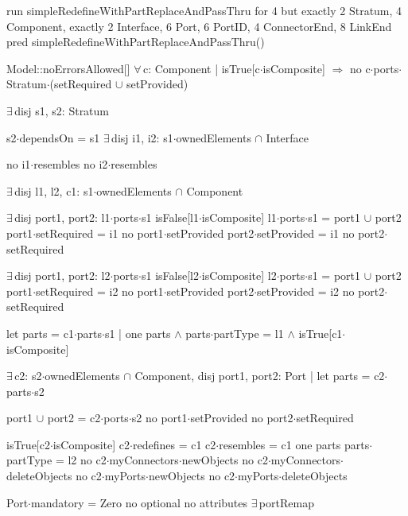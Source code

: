 run simpleRedefineWithPartReplaceAndPassThru for 4 but exactly 2 Stratum, 4 Component, exactly 2 Interface, 6 Port, 6 PortID, 4 ConnectorEnd, 8 LinkEnd
pred simpleRedefineWithPartReplaceAndPassThru()
{
  Model::noErrorsAllowed[]
  $\forall\,$c: Component |
    isTrue[c$\cdot$isComposite] $\Longrightarrow$
      no c$\cdot$ports$\cdot$Stratum$\cdot$(setRequired $\cup$ setProvided)
  
  $\exists\,$disj s1, s2: Stratum
  {
    s2$\cdot$dependsOn = s1
    $\exists\,$disj i1, i2: s1$\cdot$ownedElements $\cap$ Interface
    {
      no i1$\cdot$resembles
      no i2$\cdot$resembles
      
      $\exists\,$disj l1, l2, c1: s1$\cdot$ownedElements $\cap$ Component
      {
        $\exists\,$disj port1, port2: l1$\cdot$ports$\cdot$s1
        {
          isFalse[l1$\cdot$isComposite]
          l1$\cdot$ports$\cdot$s1 = port1 $\cup$ port2
          port1$\cdot$setRequired = i1
          no port1$\cdot$setProvided
          port2$\cdot$setProvided = i1
          no port2$\cdot$setRequired
        }

        $\exists\,$disj port1, port2: l2$\cdot$ports$\cdot$s1
        {
          isFalse[l2$\cdot$isComposite]
          l2$\cdot$ports$\cdot$s1 = port1 $\cup$ port2
          port1$\cdot$setRequired = i2
          no port1$\cdot$setProvided
          port2$\cdot$setProvided = i2
          no port2$\cdot$setRequired
        }
        
        let parts = c1$\cdot$parts$\cdot$s1 |
          one parts $\wedge$ parts$\cdot$partType = l1 $\wedge$ isTrue[c1$\cdot$isComposite]

        $\exists\,$c2: s2$\cdot$ownedElements $\cap$ Component, disj port1, port2: Port | let parts = c2$\cdot$parts$\cdot$s2
        {
          port1 $\cup$ port2 = c2$\cdot$ports$\cdot$s2
          no port1$\cdot$setProvided
          no port2$\cdot$setRequired

          isTrue[c2$\cdot$isComposite]
          c2$\cdot$redefines = c1
          c2$\cdot$resembles = c1
          one parts
          parts$\cdot$partType = l2
          no c2$\cdot$myConnectors$\cdot$newObjects
          no c2$\cdot$myConnectors$\cdot$deleteObjects
          no c2$\cdot$myPorts$\cdot$newObjects
          no c2$\cdot$myPorts$\cdot$deleteObjects
        }
      }      
    }
  }
  Port$\cdot$mandatory = Zero
  no optional
  no attributes
  $\exists\,$portRemap
}

